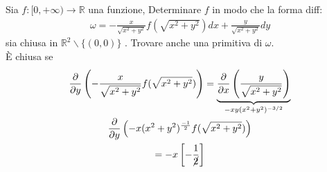 \documentclass[a4paper, oneside]{article}
\begin{document}
\begin{example}
    Sia $f: [0,+\infty) \to \mathbb{R}$ una funzione, Determinare $f$ in modo che la forma diff:
    \begin{gather*}
        \omega = -\frac{x}{\sqrt{x^2+y^2}} f(\sqrt{x^2+y^2}) dx + \frac{y}{\sqrt{x^2+y^2}} dy
    \end{gather*}
    sia chiusa in $\mathbb{R}^2 \backslash \{(0,0)\}$ . Trovare anche una primitiva di $\omega$.
    \hfil\\
    È chiusa se
    \begin{gather*}
        \frac{\partial}{\partial y} \left( -\frac{x}{\sqrt{x^2+y^2}} f(\sqrt{x^2+y^2}) \right) = \underbrace{\frac{\partial}{\partial x} \left(\frac{y}{\sqrt{x^2+y^2}}\right)}_{-xy(x^2+y^2)^{-3/2}}\\
        \frac{\partial}{\partial y}\left(-x(x^2+y^2)^{\frac{-1}{2}}f(\sqrt{x^2+y^2})   \right)\\
        = -x \left[ -\frac{1}{\cancel{2}} \right]
    \end{gather*}

\end{example}


\newpage
\end{document}
